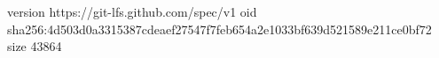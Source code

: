 version https://git-lfs.github.com/spec/v1
oid sha256:4d503d0a3315387cdeaef27547f7feb654a2e1033bf639d521589e211ce0bf72
size 43864
